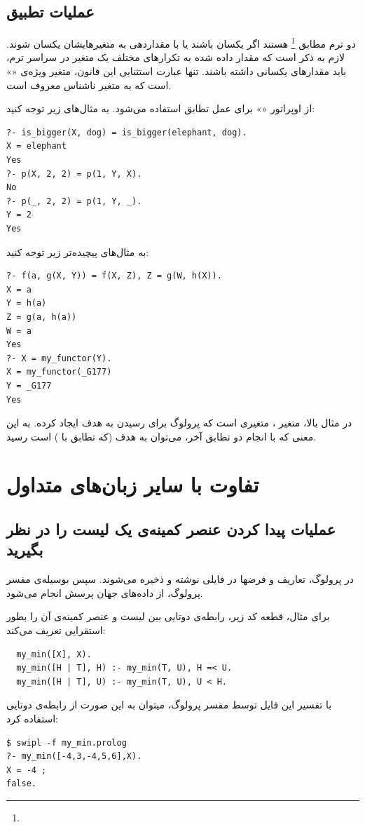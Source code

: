 \documentclass{article}
\begin{document}
\subsection{عملیات تطبیق}
دو ترم مطابق \footnote{} هستند اگر یکسان باشند یا با مقداردهی به متغیر‌هایشان
یکسان شوند.
لازم به ذکر است که مقدار داده شده به تکرار‌های مختلف یک متغیر در سراسر ترم، باید
مقدار‌های یکسانی داشته باشند. تنها عبارت استثنایی این قانون، متغیر ویژه‌ی «\lr{\tt \_}» است
که به متغیر ناشناس معروف است.

از اوپراتور «\lr{\tt =}» برای عمل تطابق استفاده می‌شود.
به مثال‌‌های زیر توجه کنید:
\begin{verbatim}
?- is_bigger(X, dog) = is_bigger(elephant, dog).
X = elephant
Yes
?- p(X, 2, 2) = p(1, Y, X).
No
?- p(_, 2, 2) = p(1, Y, _).
Y = 2
Yes
\end{verbatim}
\clearpage
به مثال‌های پیچیده‌تر زیر توجه کنید:
\begin{verbatim}
?- f(a, g(X, Y)) = f(X, Z), Z = g(W, h(X)).
X = a
Y = h(a)
Z = g(a, h(a))
W = a
Yes
?- X = my_functor(Y).
X = my_functor(_G177)
Y = _G177
Yes
\end{verbatim}
در مثال بالا، متغیر ، متغیر‌ی است که پرولوگ برای رسیدن به هدف
ایجاد کرده. به این معنی که با انجام دو تطابق آخر، می‌توان به هدف
(که تطابق  با ) است رسید.
\clearpage
\section{تفاوت با سایر زبان‌های متداول}
\subsection{عملیات پیدا کردن عنصر کمینه‌ی یک لیست را در نظر بگیرید}
\noindent در پرولوگ، تعاریف و فرضها در فایلی نوشته و ذخیره می‌شوند.
سپس بوسیله‌ی مفسر پرولوگ، از داده‌های جهان پرسش انجام می‌شود.

برای مثال، قطعه کد زیر، رابطه‌ی دوتایی بین لیست و عنصر کمینه‌ی آن را بطور استقرایی
تعریف می‌کند:
\begin{verbatim}
  my_min([X], X).
  my_min([H | T], H) :- my_min(T, U), H =< U.
  my_min([H | T], U) :- my_min(T, U), U < H.
\end{verbatim}

با تفسیر این فایل توسط مفسر پرولوگ، میتوان به این صورت از رابطه‌ی دوتایی استفاده کرد:
\begin{verbatim}
$ swipl -f my_min.prolog
?- my_min([-4,3,-4,5,6],X).
X = -4 ;
false.
\end{verbatim}
\end{document}
